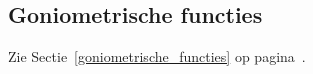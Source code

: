 \subsection{Goniometrische functies}

Zie Sectie~\ref{goniometrische_functies} op pagina~\pageref{goniometrische_functies}.


